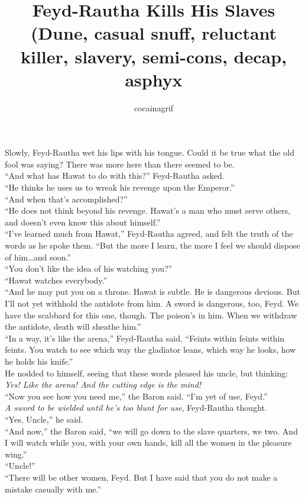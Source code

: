 \documentclass[12pt,letterpaper,draft]{memoir}
\author{cocainagrif}
\title{Feyd-Rautha Kills His Slaves (Dune, casual snuff, reluctant killer, slavery, semi-cons, decap, asphyx}
\begin{document}
\maketitle


Slowly, Feyd-Rautha wet his lips with his tongue. Could it be true what the old fool was saying? There was more here than there seemed to be.\\
“And what has Hawat to do with this?” Feyd-Rautha asked.\\
“He thinks he uses us to wreak his revenge upon the Emperor.”\\
“And when that’s accomplished?”\\
“He does not think beyond his revenge. Hawat’s a man who must serve others, and doesn’t even know this about himself.”\\
“I’ve learned much from Hawat,” Feyd-Rautha agreed, and felt the truth of the words as he spoke them. “But the more I learn, the more I feel we should dispose of him\ldots and  soon.”\\
“You don’t like the idea of his watching you?”\\
“Hawat watches everybody.”\\
“And he may put you on a throne. Hawat is subtle. He is dangerous 
devious. But I’ll not yet withhold the antidote from him. A sword is dangerous, too, Feyd. We have the scabbard for this one, though. The poison’s in him. When we withdraw the antidote, death will sheathe him.”\\
“In a way, it’s like the arena,” Feyd-Rautha said. “Feints within feints within feints. You watch to see which way the gladiator leans, which way he looks, how he holds his knife.”\\
He nodded to himself, seeing that these words pleased his uncle, but thinking: \textit{Yes! Like the arena! And the cutting edge is the mind!}\\
“Now you see how you need me,” the Baron said. “I’m yet of use, Feyd.”\\
\textit{A sword to be wielded until he’s too blunt for use}, Feyd-Rautha thought.\\
“Yes, Uncle,” he said.\\
“And now,” the Baron said, “we will go down to the slave quarters, we two. And I will watch while you, with your own hands, kill all the women in the pleasure wing.”\\
“Uncle!”\\
“There will be other women, Feyd. But I have said that you do not make a mistake casually with me.”\\
\end{document}
